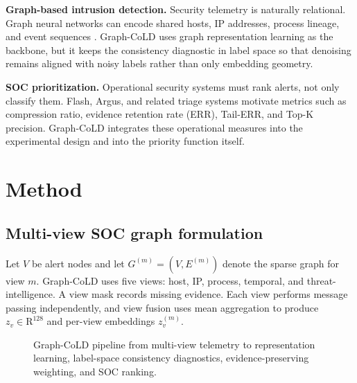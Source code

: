 \documentclass[preprint,12pt]{elsarticle}
\begin{document}
\textbf{Graph-based intrusion detection.}
Security telemetry is naturally relational. Graph neural networks can encode shared hosts, IP addresses, process lineage, and event sequences \citep{velickovic2018gat,hamilton2017graphsage}. Graph-CoLD uses graph representation learning as the backbone, but it keeps the consistency diagnostic in label space so that denoising remains aligned with noisy labels rather than only embedding geometry.

\textbf{SOC prioritization.}
Operational security systems must rank alerts, not only classify them. Flash, Argus, and related triage systems motivate metrics such as compression ratio, evidence retention rate (ERR), Tail-ERR, and Top-K precision. Graph-CoLD integrates these operational measures into the experimental design and into the priority function itself.

\section{Method}
\subsection{Multi-view SOC graph formulation}
Let $V$ be alert nodes and let $G^{(m)}=(V,E^{(m)})$ denote the sparse graph for view $m$. Graph-CoLD uses five views: host, IP, process, temporal, and threat-intelligence. A view mask records missing evidence. Each view performs message passing independently, and view fusion uses mean aggregation to produce $z_v\in \mathrm{R}^{128}$ and per-view embeddings $z_v^{(m)}$.

\begin{figure}[t]
\centering
{}
\caption{Graph-CoLD pipeline from multi-view telemetry to representation learning, label-space consistency diagnostics, evidence-preserving weighting, and SOC ranking.}
\label{fig:pipeline}
\end{figure}
\end{document}
